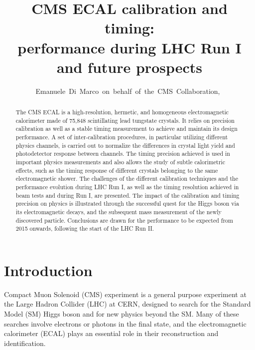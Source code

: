 \documentclass[journal]{IEEEtran}
\begin{document}
\title{CMS ECAL calibration and timing: \\ performance during LHC Run I and future prospects}

\author{Emanuele~Di~Marco~on~behalf~of~the~CMS~Collaboration,~}

\maketitle


\begin{abstract}
The CMS ECAL is a high-resolution, hermetic, and homogeneous electromagnetic calorimeter made of 75,848 scintillating lead tungstate crystals. It relies on precision calibration as well as a stable timing measurement to achieve and maintain its design performance. A set of inter-calibration procedures, in particular utilizing different physics channels, is carried out to normalize the differences in crystal light yield and photodetector response between channels. The timing precision achieved is used in important physics measurements and also allows the study of subtle calorimetric effects, such as the timing response of different crystals belonging to the same electromagnetic shower. The challenges of the different calibration techniques and the performance evolution during LHC Run I, as well as the timing resolution achieved in beam tests and during Run I, are presented. The impact of the calibration and timing precision on physics is illustrated through the successful quest for the Higgs boson via its electromagnetic decays, and the subsequent mass measurement of the newly discovered particle. Conclusions are drawn for the performance to be expected from 2015 onwards, following the start of the LHC Run II.
\end{abstract}

\begin{IEEEkeywords}
\end{IEEEkeywords}

\IEEEpeerreviewmaketitle



\section{Introduction}
\label{sec:introduction}
 Compact Muon Solenoid (CMS) experiment \cite{Chatrchyan:2008aa} is a general purpose experiment at the Large Hadron Collider (LHC) at CERN, designed to search for the Standard Model (SM) Higgs boson and for new physics beyond the SM. Many of these searches involve electrons or photons in the final state, and the electromagnetic calorimeter (ECAL) plays an essential role in their reconstruction and identification.
\end{document}

